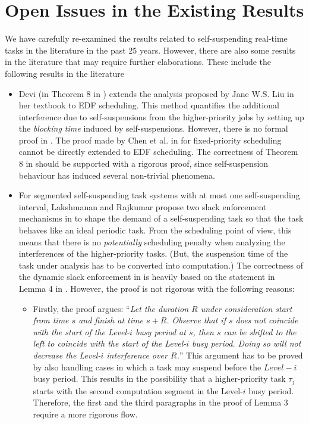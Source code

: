 \section{Open Issues in the Existing Results}

We have carefully re-examined the results related to self-suspending
real-time tasks in the literature in the past 25 years. However, there
are also some results in the literature that may require further
elaborations. These include the following results in the literature
\begin{itemize}
\item Devi (in Theorem 8 in \cite[Section
  4.5]{DBLP:conf/ecrts/Devi03}) extends the analysis proposed by Jane
  W.S. Liu in her textbook \cite[Page 164-165]{Liu:2000:RS:518501} to
  EDF scheduling. This method quantifies the additional interference
  due to self-suspensions from the higher-priority jobs by setting up
  the \emph{blocking time} induced by self-suspensions. However, there
  is no formal proof in \cite{DBLP:conf/ecrts/Devi03}. The proof made
  by Chen et al. in \cite{ChenHuangNelissen} for fixed-priority
  scheduling cannot be directly extended to EDF scheduling. The
  correctness of Theorem 8 in \cite[Section
  4.5]{DBLP:conf/ecrts/Devi03} should be supported with a rigorous
  proof, since self-suspension behaviour has induced several
  non-trivial phenomena.

\item For segmented self-suspending task systems with at most one
  self-suspending interval, Lakshmanan and Rajkumar propose two slack
  enforcement mechanisms in \cite{LR:rtas10} to shape the demand of a
  self-suspending task so that the task behaves like an ideal periodic
  task.  From the scheduling point of view, this means that there is
  no \emph{potentially} scheduling penalty when analyzing the interferences of the
  higher-priority tasks. (But, the suspension time of the task under
  analysis has to be converted into computation.) The correctness of the dynamic slack
  enforcement in \cite{LR:rtas10} is heavily based on the statement in Lemma
  4 in \cite{LR:rtas10}. However, the proof is not rigorous with the
  following reasons:
  \begin{itemize}
  \item Firstly, the proof argues: ``\emph{Let the duration $R$ under
    consideration start from time $s$ and finish at time $s +
    R$. Observe that if $s$ does not coincide with the start of the
    Level-$i$ busy period at $s$, then $s$ can be shifted to the left
    to coincide with the start of the Level-$i$ busy period. Doing so
    will not decrease the Level-$i$ interference over $R$.}'' This
    argument has to be proved by also handling cases in which a task
    may suspend before the $Level-i$ busy period. This results in the
    possibility that a higher-priority task $\tau_j$ starts with the
    second computation segment in the Level-$i$ busy
    period. Therefore, the first and the third paragraphs in the proof
    of Lemma 3 \cite{LR:rtas10} require a more rigorous flow.


\end{itemize}
\end{itemize}
